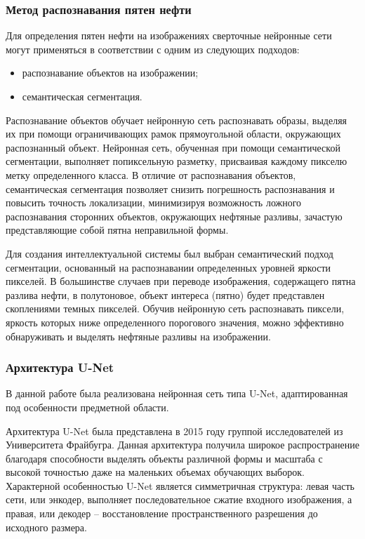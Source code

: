 \subsubsection{Метод распознавания пятен нефти}

Для определения пятен нефти на изображениях сверточные нейронные сети могут применяться в соответствии с одним из следующих подходов:

\begin{itemize}
	\item распознавание объектов на изображении;
	\item семантическая сегментация.
\end{itemize}

Распознавание объектов обучает нейронную сеть распознавать образы, выделяя их при помощи ограничивающих рамок прямоугольной области, окружающих распознанный объект. Нейронная сеть, обученная при помощи семантической сегментации, выполняет попиксельную разметку, присваивая каждому пикселю метку определенного класса. В отличие от распознавания объектов, семантическая сегментация позволяет снизить погрешность распознавания и повысить точность локализации, минимизируя возможность ложного распознавания сторонних объектов, окружающих нефтяные разливы, зачастую представляющие собой пятна неправильной формы.

Для создания интеллектуальной системы был выбран семантический подход сегментации, основанный на распознавании определенных уровней яркости пикселей. В большинстве случаев при переводе изображения, содержащего пятна разлива нефти, в полутоновое, объект интереса (пятно) будет представлен скоплениями темных пикселей. Обучив нейронную сеть распознавать пиксели, яркость которых ниже определенного порогового значения, можно эффективно обнаруживать и выделять нефтяные разливы на изображении.

\subsubsection{Архитектура U-Net}

В данной работе была реализована нейронная сеть типа U-Net, адаптированная под особенности предметной области. 

Архитектура U-Net была представлена в 2015 году группой исследователей из Университета Фрайбугра. Данная архитектура получила широкое распространение благодаря способности выделять объекты различной формы и масштаба с высокой точностью даже на маленьких объемах обучающих выборок. Характерной особенностью U-Net является симметричная структура: левая часть сети, или энкодер, выполняет последовательное сжатие входного изображения, а правая, или декодер -- восстановление пространственного разрешения до исходного размера\cite{sorokin_cnn}.

